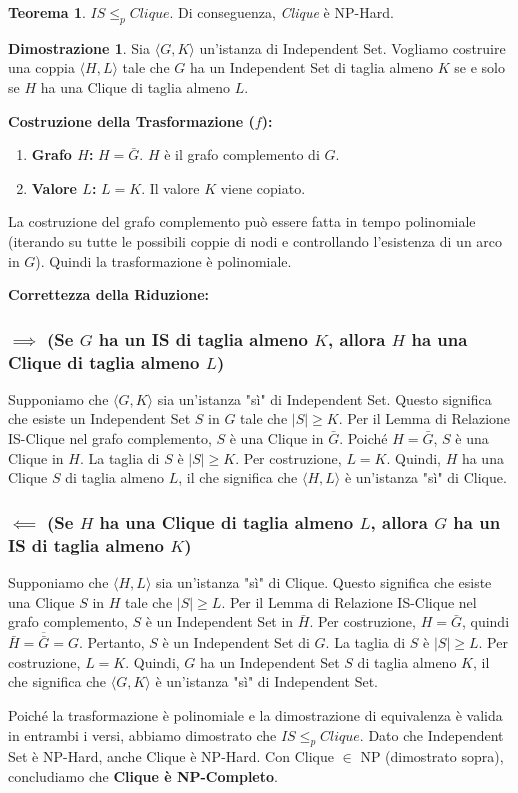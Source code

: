 \documentclass[a4paper]{article}
\theoremstyle{definition} %
\newtheorem{theorem}{Teorema}
[section]
\theoremstyle{definition} %
\newtheorem*{proof*}{Dimostrazione}
\begin{document}
\begin{theorem}
$IS \le_p Clique$. Di conseguenza, \emph{Clique} è NP-Hard.
\end{theorem}

\begin{proof*}
Sia $\langle G, K \rangle$ un'istanza di Independent Set. Vogliamo costruire una coppia $\langle H, L \rangle$ tale che $G$ ha un Independent Set di taglia almeno $K$ se e solo se $H$ ha una Clique di taglia almeno $L$.

\textbf{Costruzione della Trasformazione ($f$):}
\begin{enumerate}
    \item \textbf{Grafo $H$:} $H = \bar{G}$. $H$ è il grafo complemento di $G$.
    \item \textbf{Valore $L$:} $L = K$. Il valore $K$ viene copiato.
\end{enumerate}
La costruzione del grafo complemento può essere fatta in tempo polinomiale (iterando su tutte le possibili coppie di nodi e controllando l'esistenza di un arco in $G$). Quindi la trasformazione è polinomiale.

\textbf{Correttezza della Riduzione:}

\subsubsection{$\implies$ (Se $G$ ha un IS di taglia almeno $K$, allora $H$ ha una Clique di taglia almeno $L$)}
Supponiamo che $\langle G, K \rangle$ sia un'istanza "sì" di Independent Set. Questo significa che esiste un Independent Set $S$ in $G$ tale che $|S| \ge K$.
Per il Lemma di Relazione IS-Clique nel grafo complemento, $S$ è una Clique in $\bar{G}$.
Poiché $H=\bar{G}$, $S$ è una Clique in $H$.
La taglia di $S$ è $|S| \ge K$. Per costruzione, $L=K$.
Quindi, $H$ ha una Clique $S$ di taglia almeno $L$, il che significa che $\langle H, L \rangle$ è un'istanza "sì" di Clique.

\subsubsection{$\impliedby$ (Se $H$ ha una Clique di taglia almeno $L$, allora $G$ ha un IS di taglia almeno $K$)}
Supponiamo che $\langle H, L \rangle$ sia un'istanza "sì" di Clique. Questo significa che esiste una Clique $S$ in $H$ tale che $|S| \ge L$.
Per il Lemma di Relazione IS-Clique nel grafo complemento, $S$ è un Independent Set in $\bar{H}$.
Per costruzione, $H=\bar{G}$, quindi $\bar{H} = \overline{\bar{G}} = G$.
Pertanto, $S$ è un Independent Set di $G$.
La taglia di $S$ è $|S| \ge L$. Per costruzione, $L=K$.
Quindi, $G$ ha un Independent Set $S$ di taglia almeno $K$, il che significa che $\langle G, K \rangle$ è un'istanza "sì" di Independent Set.

Poiché la trasformazione è polinomiale e la dimostrazione di equivalenza è valida in entrambi i versi, abbiamo dimostrato che $IS \le_p Clique$. Dato che Independent Set è NP-Hard, anche Clique è NP-Hard. Con Clique $\in$ NP (dimostrato sopra), concludiamo che \textbf{Clique è NP-Completo}.
\end{proof*}
\end{document}
